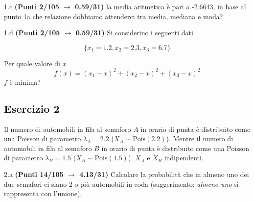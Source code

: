 \documentclass[
  11pt,
]{book}
\theoremstyle{mytheoremstyle}
\theoremstyle{mydefstyle}
\begin{document}
1.c \textbf{(Punti 2/105 \(\rightarrow\) 0.59/31)} la media aritmetica è pari a -2.6643, in base al punto 1a che relazione dobbiamo attenderci tra media, mediana e moda?

1.d \textbf{(Punti 2/105 \(\rightarrow\) 0.59/31)} Si considerino i seguenti dati

\[
\{x_1=1.2,x_2=2.3,x_3=6.7\}
\]

Per quale valore di \(x\)
\[
f(x)=(x_1-x)^2+(x_2-x)^2+(x_3-x)^2
\]
\(f\) è minima?

\subsection{Esercizio 2}\label{esercizio-2-32}

Il numero di automobili in fila al semaforo \(A\) in orario di punta è distribuito come una
Poisson di parametro \(\lambda_A=2.2\) (\(X_A\sim \text{Pois}(2.2)\)).
Mentre il numero di automobili in fila al semaforo \(B\) in orario di punta è distribuito come una
Poisson di parametro \(\lambda_B=1.5\) (\(X_B\sim \text{Pois}(1.5)\)). \(X_A\) e \(X_B\) indipendenti.

2.a \textbf{(Punti 14/105 \(\rightarrow\) 4.13/31)} Calcolare la probabilità che in almeno uno dei due semafori ci siano 2 o più automobili in coda (suggerimento: \emph{almeno uno} si rappresenta con l'unione).
\end{document}
